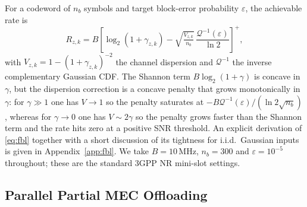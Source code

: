 \documentclass[journal]{IEEEtran}
\newcommand{\Qfunc}{\mathcal{Q}}
\begin{document}
For a codeword of $n_b$ symbols and target block-error probability
$\varepsilon$, the achievable rate is
\cite{polyanskiy2010channel}
\begin{equation}
  R_{z,k}=B\!\left[\log_2(1+\gamma_{z,k})-
    \sqrt{\tfrac{V_{z,k}}{n_b}}\,
    \frac{\Qfunc^{-1}(\varepsilon)}{\ln 2}\right]^{\!+},
  \label{eq:fbl}
\end{equation}
with $V_{z,k}=1-(1+\gamma_{z,k})^{-2}$ the channel dispersion and
$\Qfunc^{-1}$ the inverse complementary Gaussian CDF. The Shannon
term $B\log_2(1+\gamma)$ is concave in $\gamma$, but the dispersion
correction is a concave penalty that grows monotonically in
$\gamma$: for $\gamma\!\gg\!1$ one has $V\!\to\!1$ so the penalty
saturates at $-B\Qfunc^{-1}(\varepsilon)/(\ln 2\sqrt{n_b})$, whereas
for $\gamma\!\to\!0$ one has $V\!\sim\!2\gamma$ so the penalty grows
faster than the Shannon term and the rate hits zero at a positive
SNR threshold. An explicit derivation of \eqref{eq:fbl} together
with a short discussion of its tightness for i.i.d.\ Gaussian inputs
is given in Appendix~\ref{app:fbl}. We take
$B=10\,\text{MHz}$, $n_b=300$ and $\varepsilon=10^{-5}$ throughout;
these are the standard 3GPP NR mini-slot settings.

\subsection{Parallel Partial MEC Offloading}
\label{sec:mec}
\end{document}
